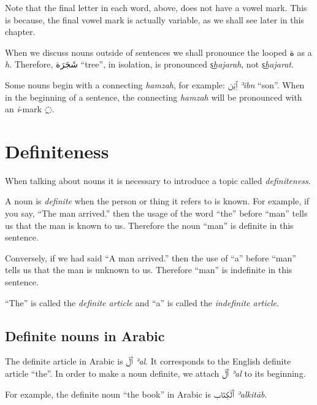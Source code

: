 \documentclass[
  10pt,
]{book}
\begin{document}
Note that the final letter in each word, above, does not have a vowel mark. This is because, the final vowel mark is actually variable, as we shall see later in this chapter.

When we discuss nouns outside of sentences we shall pronounce the looped \foreignlanguage{arabic}{ة} as a \emph{h}. Therefore,
\foreignlanguage{arabic}{شَجَرَة} \enquote{tree}, in isolation, is pronounced \emph{s͟hajarah}, not \emph{s͟hajarat}.

Some nouns begin with a connecting \emph{hamzah}, for example: \foreignlanguage{arabic}{ٱِبْن} \emph{ʾibn} \enquote{son}. When in the beginning of a sentence, the connecting \emph{hamzah} will be pronounced with an \emph{i}-mark \foreignlanguage{arabic}{◌ِ}.

\section{Definiteness}\label{definiteness}

When talking about nouns it is necessary to introduce a topic called \emph{definiteness}.

A noun is \emph{definite} when the person or thing it refers to is known. For example, if you say, \enquote{The man arrived.} then the usage of the word \enquote{the} before \enquote{man} tells us that the man is known to us. Therefore the noun \enquote{man} is definite in this sentence.

Conversely, if we had said \enquote{A man arrived.} then the use of \enquote{a} before \enquote{man} tells us that the man is unknown to us. Therefore \enquote{man} is indefinite in this sentence.

\enquote{The} is called the \emph{definite article} and \enquote{a} is called the \emph{indefinite article}.

\subsection{Definite nouns in Arabic}\label{definite-nouns-in-arabic}

The definite article in Arabic is
\foreignlanguage{arabic}{ٱَلْ} \emph{ʾal}. It corresponds to the English definite article \enquote{the}.
In order to make a noun definite, we attach
\foreignlanguage{arabic}{ٱَلْ} \emph{ʾal}
to its beginning.

For example, the definite noun \enquote{the book} in Arabic is \foreignlanguage{arabic}{ٱَلْکِتَاب} \emph{ʾalkitāb}.
\end{document}

